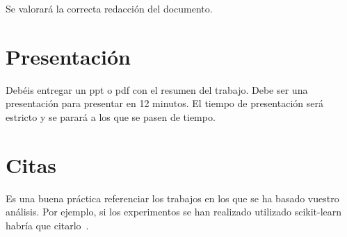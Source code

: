 \documentclass{esannV2}
\begin{document}
Se valorará la correcta redacción del documento.

\section{Presentación}
Debéis entregar un ppt o pdf con el resumen del trabajo. Debe ser una
presentación para presentar en 12 minutos. El tiempo de presentación será
estricto y se parará a los que se pasen de tiempo.

\section{Citas}
Es una buena práctica referenciar los trabajos en los que se ha basado vuestro
análisis. Por ejemplo, si los experimentos se han realizado utilizado
scikit-learn habría que citarlo~\cite{scikit-learn}.


\end{document}

